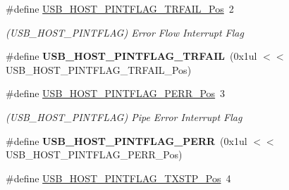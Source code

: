 \begin{DoxyCompactItemize}
\item 
\hypertarget{group___s_a_m_l21___u_s_b_gaa2c544cfb41c4bfd57fc26c82846caac}{}\#define \hyperlink{group___s_a_m_l21___u_s_b_gaa2c544cfb41c4bfd57fc26c82846caac}{U\+S\+B\+\_\+\+H\+O\+S\+T\+\_\+\+P\+I\+N\+T\+F\+L\+A\+G\+\_\+\+T\+R\+F\+A\+I\+L\+\_\+\+Pos}~2\label{group___s_a_m_l21___u_s_b_gaa2c544cfb41c4bfd57fc26c82846caac}

\begin{DoxyCompactList}\small\item\em (U\+S\+B\+\_\+\+H\+O\+S\+T\+\_\+\+P\+I\+N\+T\+F\+L\+A\+G) Error Flow Interrupt Flag \end{DoxyCompactList}\item 
\hypertarget{group___s_a_m_l21___u_s_b_gaf7367a21e790dc72b9a2e5ab779fdbff}{}\#define {\bfseries U\+S\+B\+\_\+\+H\+O\+S\+T\+\_\+\+P\+I\+N\+T\+F\+L\+A\+G\+\_\+\+T\+R\+F\+A\+I\+L}~(0x1ul $<$$<$ U\+S\+B\+\_\+\+H\+O\+S\+T\+\_\+\+P\+I\+N\+T\+F\+L\+A\+G\+\_\+\+T\+R\+F\+A\+I\+L\+\_\+\+Pos)\label{group___s_a_m_l21___u_s_b_gaf7367a21e790dc72b9a2e5ab779fdbff}

\item 
\hypertarget{group___s_a_m_l21___u_s_b_gaf055ccba171a0d300e17e975a13a44fe}{}\#define \hyperlink{group___s_a_m_l21___u_s_b_gaf055ccba171a0d300e17e975a13a44fe}{U\+S\+B\+\_\+\+H\+O\+S\+T\+\_\+\+P\+I\+N\+T\+F\+L\+A\+G\+\_\+\+P\+E\+R\+R\+\_\+\+Pos}~3\label{group___s_a_m_l21___u_s_b_gaf055ccba171a0d300e17e975a13a44fe}

\begin{DoxyCompactList}\small\item\em (U\+S\+B\+\_\+\+H\+O\+S\+T\+\_\+\+P\+I\+N\+T\+F\+L\+A\+G) Pipe Error Interrupt Flag \end{DoxyCompactList}\item 
\hypertarget{group___s_a_m_l21___u_s_b_ga5732293146ef6c23b36a55ac5ca91675}{}\#define {\bfseries U\+S\+B\+\_\+\+H\+O\+S\+T\+\_\+\+P\+I\+N\+T\+F\+L\+A\+G\+\_\+\+P\+E\+R\+R}~(0x1ul $<$$<$ U\+S\+B\+\_\+\+H\+O\+S\+T\+\_\+\+P\+I\+N\+T\+F\+L\+A\+G\+\_\+\+P\+E\+R\+R\+\_\+\+Pos)\label{group___s_a_m_l21___u_s_b_ga5732293146ef6c23b36a55ac5ca91675}

\item 
\hypertarget{group___s_a_m_l21___u_s_b_ga6ce0137fc67ca41cbb5dbd41ba75fcb4}{}\#define \hyperlink{group___s_a_m_l21___u_s_b_ga6ce0137fc67ca41cbb5dbd41ba75fcb4}{U\+S\+B\+\_\+\+H\+O\+S\+T\+\_\+\+P\+I\+N\+T\+F\+L\+A\+G\+\_\+\+T\+X\+S\+T\+P\+\_\+\+Pos}~4\label{group___s_a_m_l21___u_s_b_ga6ce0137fc67ca41cbb5dbd41ba75fcb4}


\end{DoxyCompactItemize}
